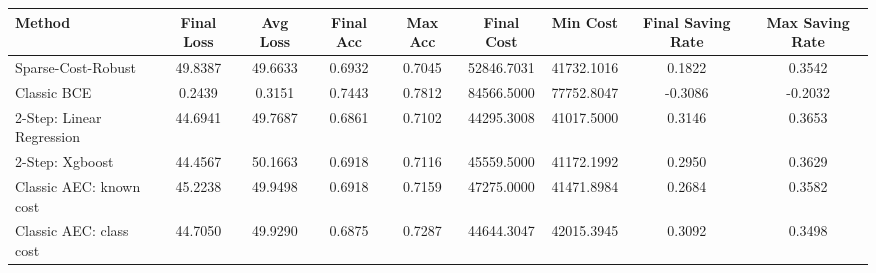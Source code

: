 \begin{tabular}{lcccccccc}
\toprule
Method & Final Loss & Avg Loss & Final Acc & Max Acc & Final Cost & Min Cost & Final Saving Rate & Max Saving Rate \\
\midrule
Sparse-Cost-Robust & 49.8387 & 49.6633 & 0.6932 & 0.7045 & 52846.7031 & 41732.1016 & 0.1822 & 0.3542 \\
Classic BCE & 0.2439 & 0.3151 & 0.7443 & 0.7812 & 84566.5000 & 77752.8047 & -0.3086 & -0.2032 \\
2-Step: Linear Regression & 44.6941 & 49.7687 & 0.6861 & 0.7102 & 44295.3008 & 41017.5000 & 0.3146 & 0.3653 \\
2-Step: Xgboost & 44.4567 & 50.1663 & 0.6918 & 0.7116 & 45559.5000 & 41172.1992 & 0.2950 & 0.3629 \\
Classic AEC: known cost & 45.2238 & 49.9498 & 0.6918 & 0.7159 & 47275.0000 & 41471.8984 & 0.2684 & 0.3582 \\
Classic AEC: class cost & 44.7050 & 49.9290 & 0.6875 & 0.7287 & 44644.3047 & 42015.3945 & 0.3092 & 0.3498 \\
\bottomrule
\end{tabular}
